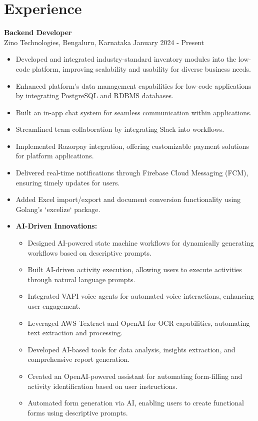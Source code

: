 \documentclass[a4paper,15pt]{article}
\begin{document}
\section*{Experience}
\textbf{Backend Developer} \\
Zino Technologies, Bengaluru, Karnataka \hfill January 2024 - Present
\begin{itemize}[noitemsep, topsep=0pt, leftmargin=*]
    \item Developed and integrated industry-standard inventory modules into the low-code platform, improving scalability and usability for diverse business needs.
    \item Enhanced platform's data management capabilities for low-code applications by integrating PostgreSQL and RDBMS databases.
    \item Built an in-app chat system for seamless communication within applications.
    \item Streamlined team collaboration by integrating Slack into workflows.
    \item Implemented Razorpay integration, offering customizable payment solutions for platform applications.
    \item Delivered real-time notifications through Firebase Cloud Messaging (FCM), ensuring timely updates for users.
    \item Added Excel import/export and document conversion functionality using Golang's `excelize` package.

    \item \textbf{AI-Driven Innovations:}
    \begin{itemize}[noitemsep, topsep=0pt, leftmargin=*]
        \item Designed AI-powered state machine workflows for dynamically generating workflows based on descriptive prompts.
        \item Built AI-driven activity execution, allowing users to execute activities through natural language prompts.
        \item Integrated VAPI voice agents for automated voice interactions, enhancing user engagement.
        \item Leveraged AWS Textract and OpenAI for OCR capabilities, automating text extraction and processing.
        \item Developed AI-based tools for data analysis, insights extraction, and comprehensive report generation.
        \item Created an OpenAI-powered assistant for automating form-filling and activity identification based on user instructions.
        \item Automated form generation via AI, enabling users to create functional forms using descriptive prompts.
    \end{itemize}
\end{itemize}
\end{document}
